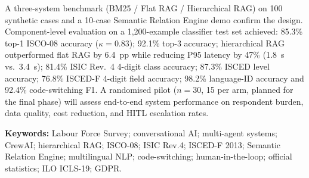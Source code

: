 \documentclass[12pt,a4wide]{report}
\theoremstyle{plain}
\theoremstyle{definition}
\theoremstyle{remark}
\begin{document}
A three-system benchmark (BM25 / Flat RAG / Hierarchical RAG) on 100 synthetic
cases and a 10-case Semantic Relation Engine demo confirm the design.
Component-level evaluation on a 1,200-example classifier test set achieved:
85.3\% top-1 ISCO-08 accuracy ($\kappa=0.83$);
92.1\% top-3 accuracy;
hierarchical RAG outperformed flat RAG by 6.4~pp while reducing P95 latency
by 47\% (1.8~s vs.\ 3.4~s);
81.4\% ISIC Rev.~4 4-digit class accuracy;
87.3\% ISCED level accuracy;
76.8\% ISCED-F 4-digit field accuracy;
98.2\% language-ID accuracy and 92.4\% code-switching F1.
A randomised pilot ($n=30$, 15 per arm, planned for the final phase) will
assess end-to-end system performance on respondent burden, data quality,
cost reduction, and HITL escalation rates.

\vspace{6pt}
\noindent\textbf{Keywords:} Labour Force Survey; conversational AI;
multi-agent systems; CrewAI; hierarchical RAG; ISCO-08; ISIC Rev.4;
ISCED-F 2013; Semantic Relation Engine; multilingual NLP; code-switching;
human-in-the-loop; official statistics; ILO ICLS-19; GDPR.

\clearpage


\tableofcontents
\clearpage
\listoffigures
\listoftables


\newpage

\setcounter{page}{1}




















\end{document}
